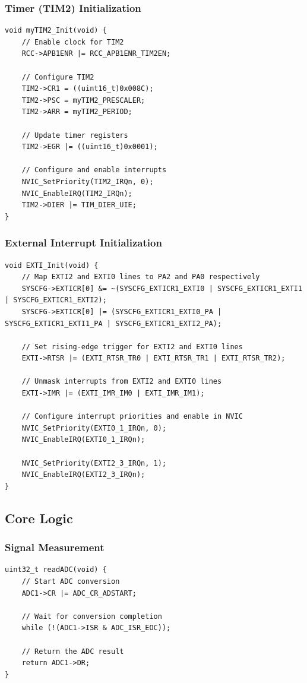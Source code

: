 \subsubsection{Timer (TIM2) Initialization}
\begin{lstlisting}[caption=Timer 2 Initialization Function]
void myTIM2_Init(void) {
    // Enable clock for TIM2
    RCC->APB1ENR |= RCC_APB1ENR_TIM2EN;
    
    // Configure TIM2
    TIM2->CR1 = ((uint16_t)0x008C);
    TIM2->PSC = myTIM2_PRESCALER;
    TIM2->ARR = myTIM2_PERIOD;
    
    // Update timer registers
    TIM2->EGR |= ((uint16_t)0x0001);
    
    // Configure and enable interrupts
    NVIC_SetPriority(TIM2_IRQn, 0);
    NVIC_EnableIRQ(TIM2_IRQn);
    TIM2->DIER |= TIM_DIER_UIE;
}
\end{lstlisting}

\subsubsection{External Interrupt Initialization}
\begin{lstlisting}[caption=EXTI Initialization Function]
void EXTI_Init(void) {
    // Map EXTI2 and EXTI0 lines to PA2 and PA0 respectively
    SYSCFG->EXTICR[0] &= ~(SYSCFG_EXTICR1_EXTI0 | SYSCFG_EXTICR1_EXTI1 | SYSCFG_EXTICR1_EXTI2);
    SYSCFG->EXTICR[0] |= (SYSCFG_EXTICR1_EXTI0_PA | SYSCFG_EXTICR1_EXTI1_PA | SYSCFG_EXTICR1_EXTI2_PA);

    // Set rising-edge trigger for EXTI2 and EXTI0 lines
    EXTI->RTSR |= (EXTI_RTSR_TR0 | EXTI_RTSR_TR1 | EXTI_RTSR_TR2);

    // Unmask interrupts from EXTI2 and EXTI0 lines
    EXTI->IMR |= (EXTI_IMR_IM0 | EXTI_IMR_IM1);

    // Configure interrupt priorities and enable in NVIC
    NVIC_SetPriority(EXTI0_1_IRQn, 0);
    NVIC_EnableIRQ(EXTI0_1_IRQn);

    NVIC_SetPriority(EXTI2_3_IRQn, 1);
    NVIC_EnableIRQ(EXTI2_3_IRQn);
}
\end{lstlisting}

\subsection{Core Logic}

\subsubsection{Signal Measurement}
\begin{lstlisting}[caption=ADC Reading Function]
uint32_t readADC(void) {
    // Start ADC conversion
    ADC1->CR |= ADC_CR_ADSTART;
    
    // Wait for conversion completion
    while (!(ADC1->ISR & ADC_ISR_EOC));
    
    // Return the ADC result
    return ADC1->DR;
}
\end{lstlisting}

